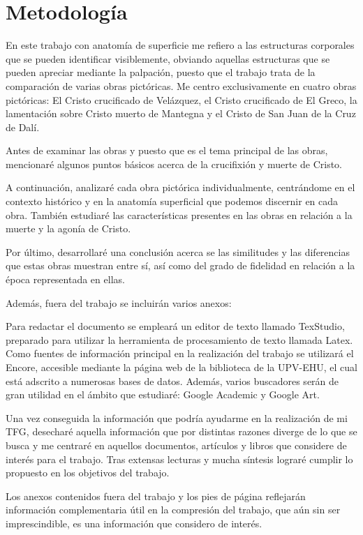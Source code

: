 \section{Metodología}
En este trabajo con anatomía de superficie me refiero a las estructuras corporales que se pueden identificar visiblemente, obviando aquellas estructuras que se pueden apreciar mediante la palpación, puesto que el trabajo trata de la comparación de varias obras pictóricas. Me centro exclusivamente en cuatro obras pictóricas: El Cristo crucificado de Velázquez, el Cristo crucificado de El Greco, la lamentación sobre Cristo muerto de Mantegna %
y el Cristo de San Juan de la Cruz de Dalí.


Antes de examinar las obras y puesto que es el tema principal de las obras, mencionaré algunos puntos básicos acerca de la crucifixión y muerte de Cristo.

A continuación, analizaré cada obra pictórica individualmente, centrándome en el contexto histórico y en la anatomía superficial que podemos discernir en cada obra. También estudiaré las características presentes en las obras en relación a la muerte y la agonía de Cristo.

Por último, desarrollaré una conclusión acerca se las similitudes y las diferencias que estas obras muestran entre sí, así como del grado de fidelidad en relación a la época representada en ellas.

Además, fuera del trabajo se incluirán varios anexos:

\vspace{12pt}

Para redactar el documento se empleará un editor de texto llamado TexStudio, preparado para utilizar la herramienta de procesamiento de texto llamada Latex. Como fuentes de información principal en la realización del trabajo se utilizará el Encore, accesible mediante la página web de la biblioteca de la UPV-EHU, el cual está adscrito a numerosas bases de datos. Además, varios buscadores serán de gran utilidad en el ámbito que estudiaré: Google Academic y Google Art.

Una vez conseguida la información que podría ayudarme en la realización de mi TFG, desecharé aquella información que por distintas razones diverge de lo que se busca y me centraré en aquellos documentos, artículos y libros que considere de interés para el trabajo. Tras extensas lecturas y mucha síntesis lograré cumplir lo propuesto en los objetivos del trabajo.

Los anexos contenidos fuera del trabajo y los pies de página reflejarán información complementaria útil en la compresión del trabajo, que aún sin ser imprescindible, es una información que considero de interés.